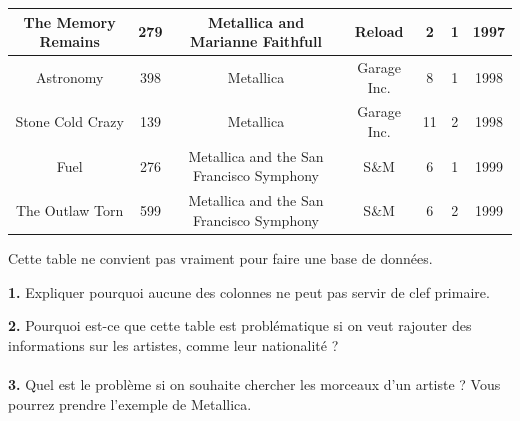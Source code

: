\documentclass[article,a4paper,firamath,12pt]{nsi}
\begin{document}
\begin{center}
\begin{tabular}{|c|c|c|c|c|c|c|}
        \hline
        The Memory Remains                                & 279                         & Metallica and Marianne Faithfull         & Reload                      & 2                           & 1                        & 1997                        \\
        \hline
        Astronomy                                         & 398                         & Metallica                                & Garage Inc.                 & 8                           & 1                        & 1998                        \\
        \hline
        Stone Cold Crazy                                  & 139                         & Metallica                                & Garage Inc.                 & 11                          & 2                        & 1998                        \\
        \hline
        Fuel                                              & 276                         & Metallica and the San Francisco Symphony & S\&M                        & 6                           & 1                        & 1999                        \\
        \hline
        The Outlaw Torn                                   & 599                         & Metallica and the San Francisco Symphony & S\&M                        & 6                           & 2                        & 1999                        \\
        \hline
    \end{tabular}
\end{center}
Cette table ne convient pas vraiment pour faire une base de données.

\textbf{1.} Expliquer pourquoi aucune des colonnes ne peut pas servir de clef primaire.\\


\textbf{2.} Pourquoi est-ce que cette table est problématique si on veut rajouter des informations sur les artistes, comme leur nationalité ?\\

\\
\newpage
\textbf{3.} Quel est le problème si on souhaite chercher les morceaux d'un artiste ? Vous pourrez prendre l'exemple de Metallica.\\	

\\
\end{document}
